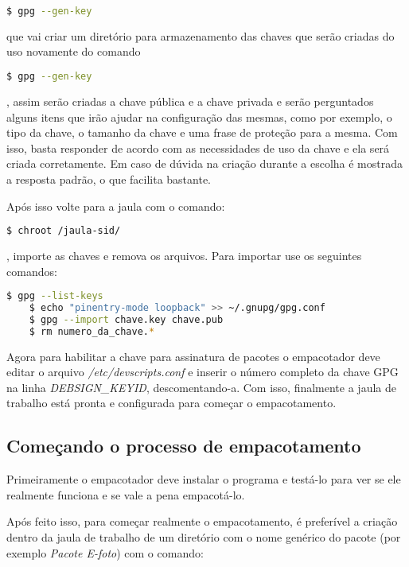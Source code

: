 \begin{lstlisting}[language=bash]
	$ gpg --gen-key
\end{lstlisting}
	
que vai criar um diretório para armazenamento das chaves que serão criadas do uso novamente do comando

\begin{lstlisting}[language=bash]
	$ gpg --gen-key
\end{lstlisting}
	
, assim serão criadas a chave pública e a chave privada e serão perguntados alguns itens que irão ajudar na configuração das mesmas, como por exemplo, o tipo da chave, o tamanho da chave e uma frase de proteção para a mesma. Com isso, basta responder de acordo com as necessidades de uso da chave e ela será criada corretamente. Em caso de dúvida na criação durante a escolha é mostrada a resposta padrão, o que facilita bastante.

Após isso volte para a jaula com o comando:

\begin{lstlisting}[language=bash]
	$ chroot /jaula-sid/
\end{lstlisting}

, importe as chaves e remova os arquivos. Para importar use os seguintes comandos: 

\begin{lstlisting}[language=bash]
	$ gpg --list-keys 
	$ echo "pinentry-mode loopback" >> ~/.gnupg/gpg.conf 
	$ gpg --import chave.key chave.pub 
	$ rm numero_da_chave.*
\end{lstlisting}

Agora para habilitar a chave para assinatura de pacotes o empacotador deve editar o arquivo \textit{/etc/devscripts.conf} e inserir o número completo da chave GPG na linha \textit{DEBSIGN\_KEYID}, descomentando-a. Com isso, finalmente a jaula de trabalho está pronta e configurada para começar o empacotamento.

\subsection{Começando o processo de empacotamento}

Primeiramente o empacotador deve instalar o programa e testá-lo para ver se ele realmente funciona e se vale a pena empacotá-lo.

Após feito isso, para começar realmente o empacotamento, é preferível a criação dentro da jaula de trabalho de um diretório com o nome genérico do pacote (por exemplo \textit{Pacote E-foto}) com o comando:

